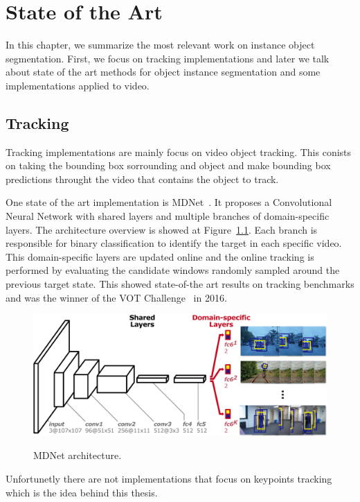 
\chapter{State of the Art}
\label{cha:stateofart}

In this chapter, we summarize the most relevant work on instance object segmentation.
First, we focus on tracking implementations and later we talk about state of the art methods for object instance segmentation and some implementations applied to video.

\section{Tracking}

Tracking implementations are mainly focus on video object tracking.
This conists on taking the bounding box sorrounding and object and make bounding box predictions throught the video that contains the object to track.

One state of the art implementation is MDNet~\cite{nam2016learning}.
It proposes a Convolutional Neural Network with shared layers and multiple branches of domain-specific layers.
The architecture overview is showed at Figure~\ref{fig:mdnet}.
Each branch is responsible for binary classification to identify the target in each specific video.
This domain-specific layers are updated online and the online tracking is performed by evaluating the candidate windows randomly sampled around the previous target state.
This showed state-of-the art results on tracking benchmarks and was the winner of the VOT Challenge~\cite{VOT_TPAMI} in 2016.

\begin{figure}[h]
\centering
\includegraphics[width=.8\linewidth]{figures/mdnet/architecture.png}
\label{fig:mdnet}
\caption{MDNet architecture. }
\end{figure}

Unfortunetly there are not implementations that focus on keypoints tracking which is the idea behind this thesis.

